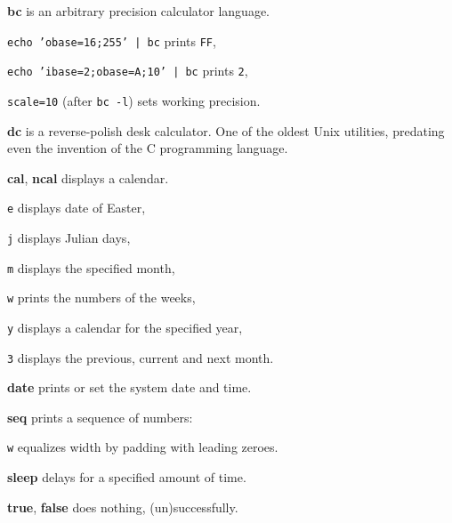 \begin{compactenum}
\item [\cmdvar] \textbf{bc} is an arbitrary precision calculator language.
\item \texttt{echo 'obase=16;255' | bc} prints \texttt{FF},
\item \texttt{echo 'ibase=2;obase=A;10' | bc} prints \texttt{2},
\item \texttt{scale=10} (after \texttt{bc -l}) sets working precision.
\item [\cmdvar] \textbf{dc} is a reverse-polish desk calculator.
One of the oldest Unix utilities, 
predating even the invention of the C programming language.
\item [\cmdutil] \textbf{cal}, \textbf{ncal} displays a calendar.
\item [\texttt{e}] displays date of Easter,
\item [\texttt{j}] displays Julian days,
\item [\texttt{m}] displays the specified month,
\item [\texttt{w}] prints the numbers of the weeks,
\item [\texttt{y}] displays a calendar for the specified year,
\item [\texttt{3}] displays the previous, current and next month.
\item [\cmdvar] \textbf{date} prints or set the system date and time.
\item [\cmdcore] \textbf{seq} prints a sequence of numbers:
\item [\texttt{w}] equalizes width by padding with leading zeroes.
\item [\cmdcore] \textbf{sleep} delays for a specified amount of time.
\item [\cmdvar] \textbf{true}, \textbf{false} does nothing, (un)successfully.
\end{compactenum}